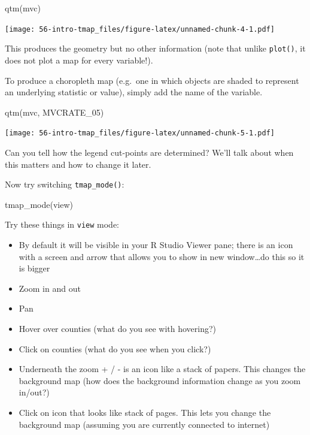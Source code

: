\documentclass[
]{book}
\newenvironment{Shaded}{\begin{snugshade}}{\end{snugshade}}
\newcommand{\FunctionTok}[1]{\textcolor[rgb]{0.00,0.00,0.00}{#1}}
\newcommand{\NormalTok}[1]{#1}
\newcommand{\StringTok}[1]{\textcolor[rgb]{0.31,0.60,0.02}{#1}}
\providecommand{\tightlist}{%
  \setlength{\itemsep}{0pt}\setlength{\parskip}{0pt}}
\begin{document}
\begin{Shaded}
\begin{Highlighting}[]
\FunctionTok{qtm}\NormalTok{(mvc)}
\end{Highlighting}
\end{Shaded}

\texttt{[image: 56-intro-tmap\_files/figure-latex/unnamed-chunk-4-1.pdf]}

This produces the geometry but no other information (note that unlike \texttt{plot()}, it does not plot a map for every variable!).

To produce a choropleth map (e.g.~one in which objects are shaded to represent an underlying statistic or value), simply add the name of the variable.

\begin{Shaded}
\begin{Highlighting}[]
\FunctionTok{qtm}\NormalTok{(mvc, }\StringTok{\textquotesingle{}MVCRATE\_05\textquotesingle{}}\NormalTok{)}
\end{Highlighting}
\end{Shaded}

\texttt{[image: 56-intro-tmap\_files/figure-latex/unnamed-chunk-5-1.pdf]}

Can you tell how the legend cut-points are determined? We'll talk about when this matters and how to change it later.

Now try switching \texttt{tmap\_mode()}:

\begin{Shaded}
\begin{Highlighting}[]
\FunctionTok{tmap\_mode}\NormalTok{(}\StringTok{\textquotesingle{}view\textquotesingle{}}\NormalTok{)}
\end{Highlighting}
\end{Shaded}

Try these things in \texttt{view} mode:

\begin{itemize}
\tightlist
\item
  By default it will be visible in your R Studio Viewer pane; there is an icon with a screen and arrow that allows you to show in new window\ldots do this so it is bigger
\item
  Zoom in and out
\item
  Pan
\item
  Hover over counties (what do you see with hovering?)
\item
  Click on counties (what do you see when you click?)
\item
  Underneath the zoom + / - is an icon like a stack of papers. This changes the background map (how does the background information change as you zoom in/out?)
\item
  Click on icon that looks like stack of pages. This lets you change the background map (assuming you are currently connected to internet)
\end{itemize}
\end{document}
